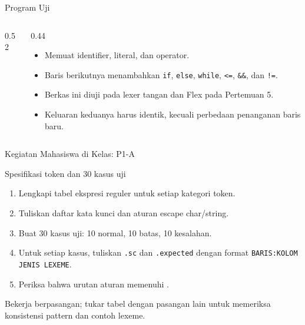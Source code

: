 \documentclass[aspectratio=169,10pt,t]{beamer}
\begin{document}
\begin{frame}[fragile]{Program Uji }
  \begin{columns}[T,onlytextwidth]
    \begin{column}{0.52\textwidth}
      
    \end{column}
    \begin{column}{0.44\textwidth}
      \begin{itemize}
        \item Memuat identifier, literal, dan operator.
        \item Baris berikutnya menambahkan \texttt{if}, \texttt{else},
              \texttt{while}, \texttt{<=}, \texttt{\&\&}, dan
              \texttt{!=}.
        \item Berkas ini diuji pada lexer tangan dan Flex pada
              Pertemuan 5.
        \item Keluaran keduanya harus identik, kecuali perbedaan
              penanganan baris baru.
      \end{itemize}
    \end{column}
  \end{columns}
\end{frame}

\begin{frame}{Kegiatan Mahasiswa di Kelas: P1-A}
  \begin{block}{Spesifikasi token dan 30 kasus uji}
    \footnotesize
    \begin{enumerate}
      \setlength{\itemsep}{1pt}
      \item Lengkapi tabel ekspresi reguler untuk setiap kategori token.
      \item Tuliskan daftar kata kunci dan aturan escape char/string.
      \item Buat 30 kasus uji: 10 normal, 10 batas, 10 kesalahan.
      \item Untuk setiap kasus, tuliskan \texttt{.sc} dan
            \texttt{.expected} dengan format
            \texttt{BARIS:KOLOM JENIS LEXEME}.
      \item Periksa bahwa urutan aturan memenuhi .
    \end{enumerate}
  \end{block}

  \vspace{4pt}
  {\footnotesize\color{ubbblue!80}Bekerja berpasangan; tukar tabel
  dengan pasangan lain untuk memeriksa konsistensi pattern dan contoh
  lexeme.}
\end{frame}
\end{document}
